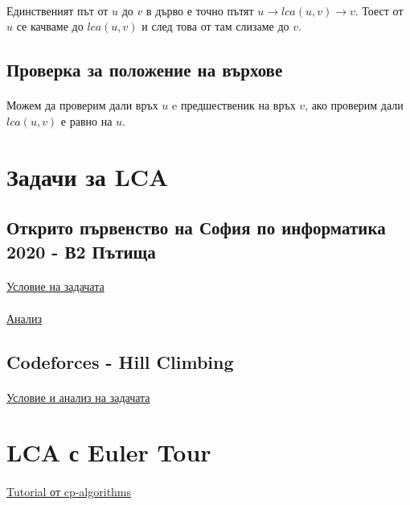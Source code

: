 \documentclass[12pt]{article}
\begin{document}
\paragraph*{}
Единственият път от $u$ до $v$ в дърво е точно пътят $u \rightarrow lca(u, v) \rightarrow v$. Тоест от $u$ се качваме до $lca(u, v)$ и след това от там слизаме до $v$. 
\subsection*{Проверка за положение на върхове}
\paragraph*{}
Можем да проверим дали връх $u$ e предшественик на връх $v$, ако проверим дали $lca(u, v)$ е равно на $u$.

\section*{Задачи за LCA}
\subsection*{Открито първенство на София по информатика 2020 - В2 Пътища}
\paragraph*{}
\href{https://arena.olimpiici.com/#/catalog/533/problem/1326}{Условие на задачата}
\paragraph*{}
\href{https://www.youtube.com/watch?v=C1oz4oq7YWc}{Анализ}

\subsection*{Codeforces - Hill Climbing}
\paragraph*{}
\href{https://codeforces.com/problemset/problem/406/D}{Условие и анализ на задачата}

\section*{LCA с Euler Tour}
\paragraph*{}
\href{https://cp-algorithms.com/graph/lca.html}{Tutorial от cp-algorithms}
\end{document}
